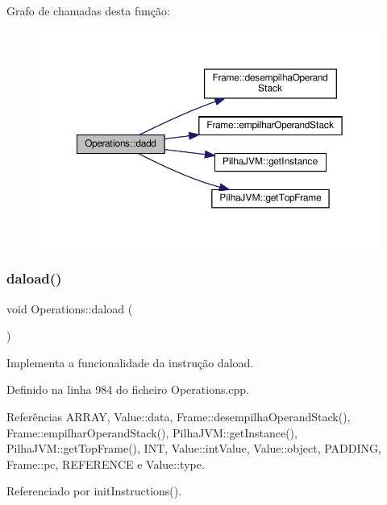 Grafo de chamadas desta função\+:\nopagebreak
\begin{figure}[H]
\begin{center}
\leavevmode
\includegraphics[width=350pt]{classOperations_a8a23241bed8c033ab75994a18bf2a702_cgraph}
\end{center}
\end{figure}
\mbox{\label{classOperations_a63691de547749780c372e285bd6a97bc}} 
\subsubsection{\texorpdfstring{daload()}{daload()}}
{\footnotesize\ttfamily void Operations\+::daload (\begin{DoxyParamCaption}{ }\end{DoxyParamCaption})\hspace{0.3cm}{\ttfamily [private]}}



Implementa a funcionalidade da instrução daload. 



Definido na linha 984 do ficheiro Operations.\+cpp.



Referências A\+R\+R\+AY, Value\+::data, Frame\+::desempilha\+Operand\+Stack(), Frame\+::empilhar\+Operand\+Stack(), Pilha\+J\+V\+M\+::get\+Instance(), Pilha\+J\+V\+M\+::get\+Top\+Frame(), I\+NT, Value\+::int\+Value, Value\+::object, P\+A\+D\+D\+I\+NG, Frame\+::pc, R\+E\+F\+E\+R\+E\+N\+CE e Value\+::type.



Referenciado por init\+Instructions().

